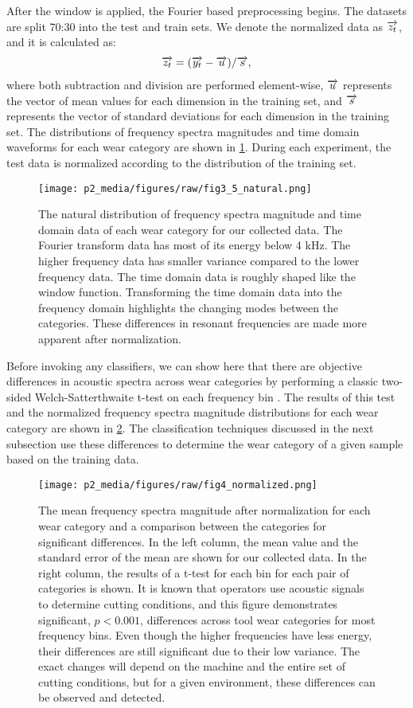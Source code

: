 After the window is applied, the Fourier based preprocessing begins.
The datasets are split 70:30 into the test and train sets. 
We denote the normalized data as $\overrightarrow{z_t}$, and it is calculated as:
\begin{align}
\overrightarrow{z_t} = (\overrightarrow{y_t} - \overrightarrow{u}) / \overrightarrow{s},
\end{align}
where both subtraction and division are performed element-wise, $\overrightarrow{u}$ represents the vector
of mean values for each dimension in the training set, 
and $\overrightarrow{s}$ represents the vector of standard deviations for each
dimension in the training set. 
The distributions of frequency spectra magnitudes and time domain waveforms
for each wear category are shown in \ref{fig:natural}.
During each experiment, the test data is normalized according to the distribution of the training set.

\begin{figure}[t!]
\centering
\texttt{[image: p2\_media/figures/raw/fig3\_5\_natural.png]}
\caption{
The natural distribution of frequency spectra magnitude 
and time domain data of each wear category for our collected data.
The Fourier transform data has most of its energy below 4 kHz.
The higher frequency data has smaller variance compared to the
lower frequency data.
The time domain data is roughly shaped like the window function.
Transforming the time domain data into the frequency domain highlights
the changing modes between the categories.
These differences in resonant frequencies are made more apparent after normalization.
}
\label{fig:natural}
\end{figure}

Before invoking any classifiers, we can show here that there are 
objective differences in acoustic spectra across wear categories 
by performing a classic two-sided Welch-Satterthwaite t-test on each frequency bin \cite{Tamhane2000}.
The results of this test and the normalized frequency spectra magnitude distributions
for each wear category are shown in \ref{fig:sigs}.
The classification techniques discussed in the next subsection use these differences to 
determine the wear category of a given sample based on the training data.

\begin{figure}[t!]
\centering
\texttt{[image: p2\_media/figures/raw/fig4\_normalized.png]}
\caption{
The mean frequency spectra magnitude after normalization for each wear category and a 
comparison between the categories for significant differences.
In the left column, the mean value and the standard error of the mean are shown for our collected data.
In the right column, the results of a t-test for each bin for each pair of categories is shown.
It is known that operators use acoustic signals to determine cutting conditions,
and this figure demonstrates significant, $p < 0.001$, differences across tool wear categories
for most frequency bins. Even though the higher frequencies have less energy, their differences
are still significant due to their low variance.
The exact changes will depend on the machine and the entire set of cutting conditions, but 
for a given environment, these differences can be observed and detected.
}
\label{fig:sigs}
\end{figure}

